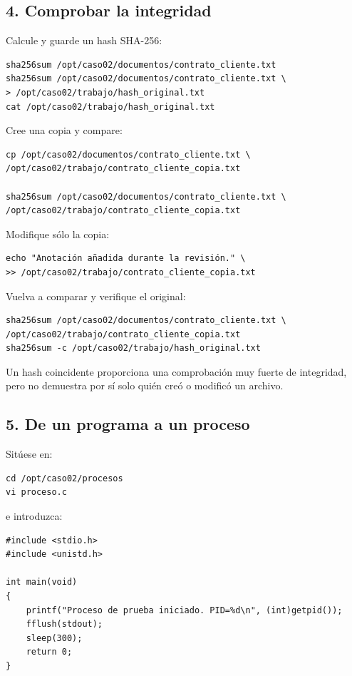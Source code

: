\subsection*{4. Comprobar la integridad}

Calcule y guarde un hash SHA-256:
\begin{verbatim}
sha256sum /opt/caso02/documentos/contrato_cliente.txt
sha256sum /opt/caso02/documentos/contrato_cliente.txt \
> /opt/caso02/trabajo/hash_original.txt
cat /opt/caso02/trabajo/hash_original.txt
\end{verbatim}

Cree una copia y compare:
\begin{verbatim}
cp /opt/caso02/documentos/contrato_cliente.txt \
/opt/caso02/trabajo/contrato_cliente_copia.txt

sha256sum /opt/caso02/documentos/contrato_cliente.txt \
/opt/caso02/trabajo/contrato_cliente_copia.txt
\end{verbatim}

Modifique sólo la copia:
\begin{verbatim}
echo "Anotación añadida durante la revisión." \
>> /opt/caso02/trabajo/contrato_cliente_copia.txt
\end{verbatim}

Vuelva a comparar y verifique el original:
\begin{verbatim}
sha256sum /opt/caso02/documentos/contrato_cliente.txt \
/opt/caso02/trabajo/contrato_cliente_copia.txt
sha256sum -c /opt/caso02/trabajo/hash_original.txt
\end{verbatim}

Un hash coincidente proporciona una comprobación muy fuerte de integridad, pero no demuestra por sí solo quién creó o modificó un archivo.

\subsection*{5. De un programa a un proceso}

Sitúese en:
\begin{verbatim}
cd /opt/caso02/procesos
vi proceso.c
\end{verbatim}

e introduzca:
\begin{verbatim}
#include <stdio.h>
#include <unistd.h>

int main(void)
{
    printf("Proceso de prueba iniciado. PID=%d\n", (int)getpid());
    fflush(stdout);
    sleep(300);
    return 0;
}
\end{verbatim}

